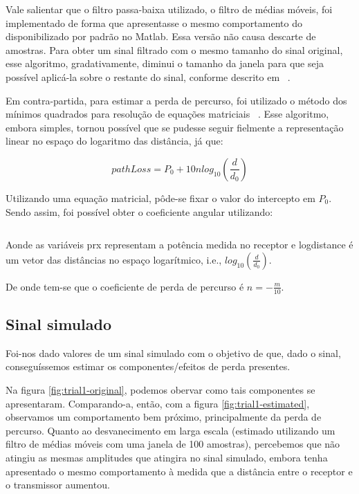 \documentclass[journal,11pt,twocolumn]{IEEEtran}
\begin{document}
Vale salientar que o filtro passa-baixa utilizado, o filtro de médias móveis, foi implementado de forma que apresentasse o mesmo comportamento do disponibilizado por padrão no Matlab. Essa versão não causa descarte de amostras. Para obter um sinal filtrado com o mesmo tamanho do sinal original, esse algoritmo, gradativamente, diminui o tamanho da janela para que seja possível aplicá-la sobre o restante do sinal, conforme descrito em ~\cite{movmean}.

Em contra-partida, para estimar a perda de percurso, foi utilizado o método dos mínimos quadrados para resolução de equações matriciais ~\cite{lstsq}. Esse algoritmo, embora simples, tornou possível que se pudesse seguir fielmente a representação linear no espaço do logaritmo das distância, já que:

\begin{equation*}
    pathLoss = P_{0} + 10nlog_{10}\left(\frac{d}{d_{0}}\right)
\end{equation*}

Utilizando uma equação matricial, pôde-se fixar o valor do intercepto em $P_{0}$. Sendo assim, foi possível obter o coeficiente angular utilizando:

\inputminted[linenos=true]{python}{code/pathloss.py}

Aonde as variáveis prx representam a potência medida no receptor e logdistance é um vetor das distâncias no espaço logarítmico, i.e., $log_{10}\left(\frac{d}{d_{0}}\right)$.

De onde tem-se que o coeficiente de perda de percurso é $n = -\frac{m}{10}$.
\subsection{Sinal simulado}
Foi-nos dado valores de um sinal simulado com o objetivo de que, dado o sinal, conseguíssemos estimar os componentes/efeitos de perda presentes.

Na figura \ref{fig:trial1-original}, podemos obervar como tais componentes se apresentaram. Comparando-a, então, com a figura \ref{fig:trial1-estimated}, observamos um comportamento bem próximo, principalmente da perda de percurso. Quanto ao desvanecimento em larga escala (estimado utilizando um filtro de médias móveis com uma janela de 100 amostras), percebemos que não atingiu as mesmas amplitudes que atingira no sinal simulado, embora tenha apresentado o mesmo comportamento à medida que a distância entre o receptor e o transmissor aumentou.
\end{document}
